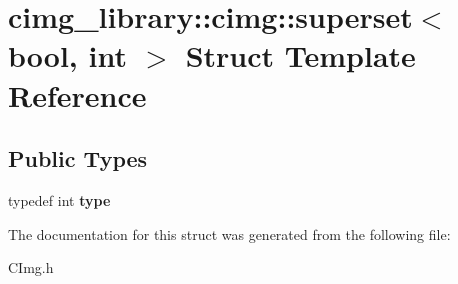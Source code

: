 \hypertarget{structcimg__library_1_1cimg_1_1superset_3_01bool_00_01int_01_4}{\section{cimg\-\_\-library\-:\-:cimg\-:\-:superset$<$ bool, int $>$ Struct Template Reference}
\label{structcimg__library_1_1cimg_1_1superset_3_01bool_00_01int_01_4}
}
\subsection*{Public Types}
\begin{DoxyCompactItemize}
\item 
\hypertarget{structcimg__library_1_1cimg_1_1superset_3_01bool_00_01int_01_4_a74922e615018f66e3864765d2bad0724}{typedef int {\bfseries type}}\label{structcimg__library_1_1cimg_1_1superset_3_01bool_00_01int_01_4_a74922e615018f66e3864765d2bad0724}

\end{DoxyCompactItemize}


The documentation for this struct was generated from the following file\-:\begin{DoxyCompactItemize}
\item 
C\-Img.\-h\end{DoxyCompactItemize}
